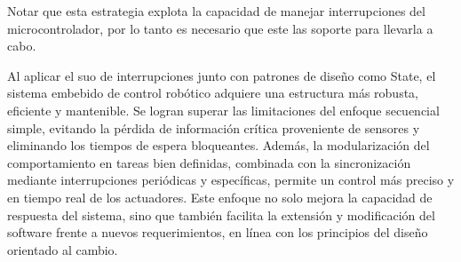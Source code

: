 Notar que esta estrategia explota la capacidad de manejar interrupciones del microcontrolador, por lo tanto es necesario que este las soporte para llevarla a cabo.

Al aplicar el suo de interrupciones junto con patrones de diseño como State, el sistema embebido de control robótico adquiere una estructura más robusta, eficiente y mantenible. Se logran superar las limitaciones del enfoque secuencial simple, evitando la pérdida de información crítica proveniente de sensores y eliminando los tiempos de espera bloqueantes. Además, la modularización del comportamiento en tareas bien definidas, combinada con la sincronización mediante interrupciones periódicas y específicas, permite un control más preciso y en tiempo real de los actuadores. Este enfoque no solo mejora la capacidad de respuesta del sistema, sino que también facilita la extensión y modificación del software frente a nuevos requerimientos, en línea con los principios del diseño orientado al cambio.

